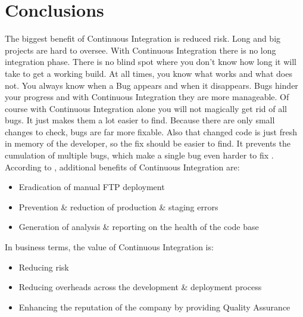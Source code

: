 \section{Conclusions}\label{sec:conclusions}

The biggest benefit of Continuous Integration is reduced risk. Long and big
projects are hard to oversee. With Continuous Integration there is no long
integration phase. There is no blind spot where you don't know how long it will
take to get a working build. At all times, you know what works and what does
not.  You always know when a Bug appears and when it disappears. Bugs hinder
your progress and with Continuous Integration they are more manageable. Of
course with Continuous Integration alone you will not magically get rid of all
bugs. It just makes them a lot easier to find. Because there are only small
changes to check, bugs are far more fixable. Also that changed code is just
fresh in memory of the developer, so the fix should be easier to find.  It
prevents the cumulation of multiple bugs, which make a single bug even harder to
fix \cite{fowler:2006}.\\

According to \cite{weiss:2013}, additional benefits of Continuous Integration
are:

\begin{itemize}
    \item Eradication of manual FTP deployment
    \item Prevention \& reduction of production \& staging errors
    \item Generation of analysis \& reporting on the health of the code base
\end{itemize}

In business terms, the value of Continuous Integration is:
\begin{itemize}
    \item Reducing risk
    \item Reducing overheads across the development \& deployment process
    \item Enhancing the reputation of the company by providing Quality Assurance
\end{itemize}



